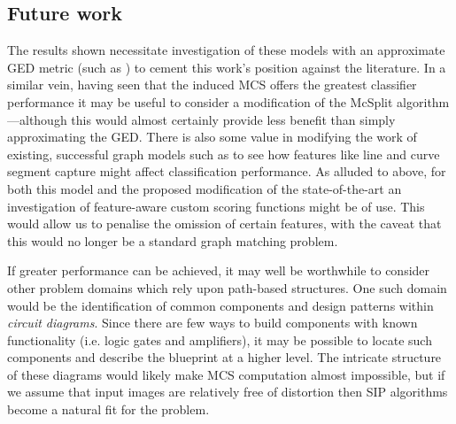 \documentclass{mpaper}
\begin{document}
\subsection{Future work}
The results shown necessitate investigation of these models with an approximate GED metric (such as \citeauthor{GED-Approx} \cite{GED-Approx}) to cement this work's position against the literature.
In a similar vein, having seen that the induced MCS offers the greatest classifier performance it may be useful to consider a modification of the McSplit algorithm \cite{MCS-McSplit}---although this would almost certainly provide less benefit than simply approximating the GED.
There is also some value in modifying the work of existing, successful graph models such as \citeauthor{Graphs-Handwriting} \cite{Graphs-Handwriting} to see how features like line and curve segment capture might affect classification performance.
As alluded to above, for both this model and the proposed modification of the state-of-the-art an investigation of feature-aware custom scoring functions might be of use.
This would allow us to penalise the omission of certain features, with the caveat that this would no longer be a standard graph matching problem.


If greater performance can be achieved, it may well be worthwhile to consider other problem domains which rely upon path-based structures.
One such domain would be the identification of common components and design patterns within \emph{circuit diagrams}.
Since there are few ways to build components with known functionality (i.e. logic gates and amplifiers), it may be possible to locate such components and describe the blueprint at a higher level.
The intricate structure of these diagrams would likely make MCS computation almost impossible, but if we assume that input images are relatively free of distortion then SIP algorithms become a natural fit for the problem.
\end{document}
